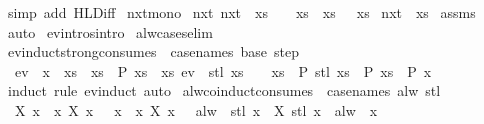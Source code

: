 \begin{isabellebody}
%
\isatagproof
{}\isamarkupfalse%
\ {\isacharparenleft}simp\ add{\isacharcolon}\ HLD{\isacharunderscore}iff{\isacharparenright}%
\endisatagproof
{\isafoldproof}%
%
\isadelimproof
\isanewline
%
\endisadelimproof
\isanewline
{}\isamarkupfalse%
\ nxt{\isacharunderscore}mono{\isacharcolon}\isanewline
{}\ nxt{\isacharcolon}\ {\isachardoublequoteopen}nxt\ {\isasymphi}\ xs{\isachardoublequoteclose}\ \ {}{\isacharcolon}\ {\isachardoublequoteopen}{\isasymAnd}\ xs{\isachardot}\ {\isasymphi}\ xs\ {\isasymLongrightarrow}\ {\isasympsi}\ xs{\isachardoublequoteclose}\isanewline
{}\ {\isachardoublequoteopen}nxt\ {\isasympsi}\ xs{\isachardoublequoteclose}\isanewline
%
\isadelimproof
%
\endisadelimproof
%
\isatagproof
{}\isamarkupfalse%
\ assms\ \isamarkupfalse%
\ auto%
\endisatagproof
{\isafoldproof}%
%
\isadelimproof
\isanewline
%
\endisadelimproof
\isanewline
{}\isamarkupfalse%
\ ev{\isachardot}intros{\isacharbrackleft}intro{\isacharbrackright}\isanewline
{}\isamarkupfalse%
\ alw{\isachardot}cases{\isacharbrackleft}elim{\isacharbrackright}\isanewline
\isanewline
{}\isamarkupfalse%
\ ev{\isacharunderscore}induct{\isacharunderscore}strong{\isacharbrackleft}consumes\ {}{\isacharcomma}\ case{\isacharunderscore}names\ base\ step{\isacharbrackright}{\isacharcolon}\isanewline
\ \ {\isachardoublequoteopen}ev\ {\isasymphi}\ x\ {\isasymLongrightarrow}\ {\isacharparenleft}{\isasymAnd}xs{\isachardot}\ {\isasymphi}\ xs\ {\isasymLongrightarrow}\ P\ xs{\isacharparenright}\ {\isasymLongrightarrow}\ {\isacharparenleft}{\isasymAnd}xs{\isachardot}\ ev\ {\isasymphi}\ {\isacharparenleft}stl\ xs{\isacharparenright}\ {\isasymLongrightarrow}\ {\isasymnot}\ {\isasymphi}\ xs\ {\isasymLongrightarrow}\ P\ {\isacharparenleft}stl\ xs{\isacharparenright}\ {\isasymLongrightarrow}\ P\ xs{\isacharparenright}\ {\isasymLongrightarrow}\ P\ x{\isachardoublequoteclose}\isanewline
%
\isadelimproof
\ \ %
\endisadelimproof
%
\isatagproof
{}\isamarkupfalse%
\ {\isacharparenleft}induct\ rule{\isacharcolon}\ ev{\isachardot}induct{\isacharparenright}\ auto%
\endisatagproof
{\isafoldproof}%
%
\isadelimproof
\isanewline
%
\endisadelimproof
\isanewline
{}\isamarkupfalse%
\ alw{\isacharunderscore}coinduct{\isacharbrackleft}consumes\ {}{\isacharcomma}\ case{\isacharunderscore}names\ alw\ stl{\isacharbrackright}{\isacharcolon}\isanewline
\ \ {\isachardoublequoteopen}X\ x\ {\isasymLongrightarrow}\ {\isacharparenleft}{\isasymAnd}x{\isachardot}\ X\ x\ {\isasymLongrightarrow}\ {\isasymphi}\ x{\isacharparenright}\ {\isasymLongrightarrow}\ {\isacharparenleft}{\isasymAnd}x{\isachardot}\ X\ x\ {\isasymLongrightarrow}\ {\isasymnot}\ alw\ {\isasymphi}\ {\isacharparenleft}stl\ x{\isacharparenright}\ {\isasymLongrightarrow}\ X\ {\isacharparenleft}stl\ x{\isacharparenright}{\isacharparenright}\ {\isasymLongrightarrow}\ alw\ {\isasymphi}\ x{\isachardoublequoteclose}\isanewline

\end{isabellebody}
